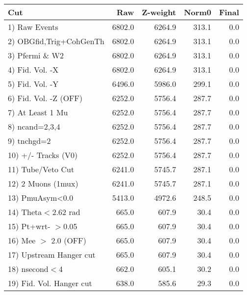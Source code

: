  \begin{table}[h!]\centering
 \begin{tabular}{||l||r|r|r|r||}
 \hline
 \hline
 Cut & Raw & Z-weight & Norm0 & Final \\
 \hline
  1) Raw Events           &      6802.0 &      6264.9 &       313.1 &         0.0 \\
  2) OBGfid,Trig+CohGenTh &      6802.0 &      6264.9 &       313.1 &         0.0 \\
  3) Pfermi \& W2         &      6802.0 &      6264.9 &       313.1 &         0.0 \\
  4) Fid. Vol. -X         &      6802.0 &      6264.9 &       313.1 &         0.0 \\
  5) Fid. Vol. -Y         &      6496.0 &      5986.0 &       299.1 &         0.0 \\
  6) Fid. Vol. -Z (OFF)   &      6252.0 &      5756.4 &       287.7 &         0.0 \\
  7) At Least 1 Mu        &      6252.0 &      5756.4 &       287.7 &         0.0 \\
  8) ncand=2,3,4          &      6252.0 &      5756.4 &       287.7 &         0.0 \\
  9) tnchgd=2             &      6252.0 &      5756.4 &       287.7 &         0.0 \\
 10) +/- Tracks (V0)      &      6252.0 &      5756.4 &       287.7 &         0.0 \\
 11) Tube/Veto Cut        &      6241.0 &      5745.7 &       287.1 &         0.0 \\
 12) 2 Muons (1mux)       &      6241.0 &      5745.7 &       287.1 &         0.0 \\
 13) PmuAsym<0.0          &      5413.0 &      4972.6 &       248.5 &         0.0 \\
 14) Theta$<$2.62 rad     &       665.0 &       607.9 &        30.4 &         0.0 \\
 15) Pt+wrt- $>$0.05      &       665.0 &       607.9 &        30.4 &         0.0 \\
 16) Mee $>$ 2.0  (OFF)   &       665.0 &       607.9 &        30.4 &         0.0 \\
 17) Upstream Hanger cut  &       665.0 &       607.9 &        30.4 &         0.0 \\
 18) nsecond$<$4          &       662.0 &       605.1 &        30.2 &         0.0 \\
 19) Fid. Vol. Hanger cut &       638.0 &       585.6 &        29.3 &         0.0 \\

\end{tabular}
\end{table}
